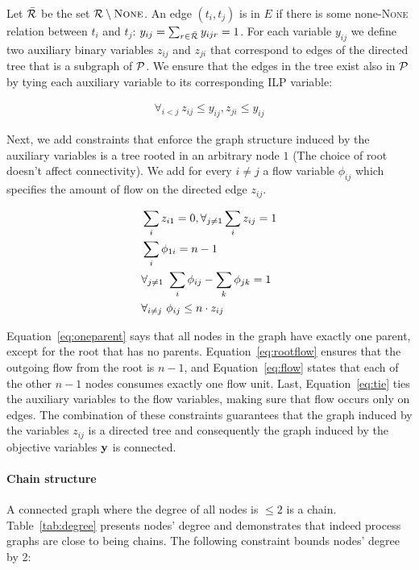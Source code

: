  Let $\bar{\mathcal{R}}$ be the set $\mathcal{R} \setminus \mbox{\textsc{None}}$. An edge $(t_i,t_j)$ is in $E$ if there is some none-\textsc{None} relation between $t_i$ and $t_j$: $y_{ij}=\sum_{r \in \bar{\mathcal{R}}} y_{ijr}=1$. For each variable $y_{ij}$ we define two auxiliary binary variables $z_{ij}$ and $z_{ji}$ that correspond to edges of the directed tree that is a subgraph of $\mathcal{P}$. We ensure that the edges in the tree exist also in $\mathcal{P}$ by tying each auxiliary variable to its corresponding ILP variable:
 
\begin{align}
\forall_{i<j} \ z_{ij} \leq y_{ij}, z_{ji} \leq y_{ij}
\end{align}

Next, we add constraints that enforce the graph structure induced by the auxiliary variables is a tree rooted in an arbitrary node $1$ (The choice of root doesn't affect connectivity). We add for every $i \neq j$ a flow variable $\phi_{ij}$ which specifies the amount of flow on the directed edge $z_{ij}$.

\begin{align}
\small &\sum_{i} z_{i1} =0, \forall_{j \neq 1} \sum_{i} z_{ij}=1 \label{eq:oneparent} \\ 
&\sum_{i} \phi_{1i}=n-1 \label{eq:rootflow} \\ 
&\forall_{j \neq 1} \ \sum_{i} \phi_{ij} - \sum_{k} \phi_{jk}=1 \label{eq:flow} \\
&\forall_{i \neq j} \ \phi_{ij} \leq n \cdot z_{ij} \label{eq:tie} 
\end{align}

Equation~\ref{eq:oneparent} says that all nodes in the graph have exactly one parent, except for the root that has no parents. Equation~\ref{eq:rootflow} ensures that the outgoing flow from the root is $n-1$, and Equation~\ref{eq:flow} states that each of the other $n-1$ nodes consumes exactly one flow unit. Last, Equation~\ref{eq:tie} ties the auxiliary variables to the flow variables, making sure that flow occurs only on edges. The combination of these constraints guarantees that the graph induced by the variables $z_{ij}$ is a directed tree and consequently the graph induced by the objective variables $\mathbf{y}$ is connected.

\paragraph{Chain structure} 
A connected graph where the degree of all nodes is $\leq 2$ is a chain. Table~\ref{tab:degree} presents nodes' degree and demonstrates that indeed process graphs are close to being chains. The following constraint bounds nodes' degree by 2:

